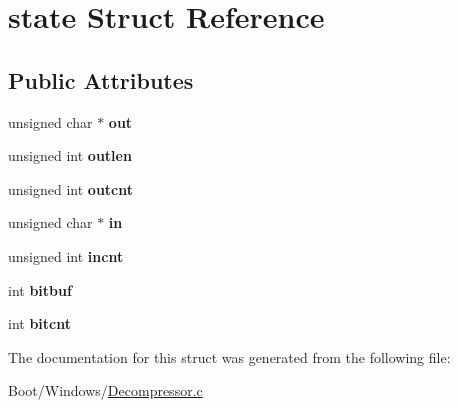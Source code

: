 \hypertarget{structstate}{}\section{state Struct Reference}
\label{structstate}
\subsection*{Public Attributes}
\begin{DoxyCompactItemize}
\item 
\mbox{\label{structstate_a8802c4d6ed3336d4d1f9a1ca86e0b1eb}} 
unsigned char $\ast$ {\bfseries out}
\item 
\mbox{\label{structstate_a3ee881b11de9c743f31ce864342ff33b}} 
unsigned int {\bfseries outlen}
\item 
\mbox{\label{structstate_a24b9c400243f3eda2e148b06826ebb7d}} 
unsigned int {\bfseries outcnt}
\item 
\mbox{\label{structstate_aafccd28823b0f3e3a2ddefa99f2fad61}} 
unsigned char $\ast$ {\bfseries in}
\item 
\mbox{\label{structstate_a46cb495bb708ecf091f4f2afdf0263b4}} 
unsigned int {\bfseries incnt}
\item 
\mbox{\label{structstate_a582d99a570119648c33ef9c5acf00a0f}} 
int {\bfseries bitbuf}
\item 
\mbox{\label{structstate_ad1c5dbfc0c1c555bd5e30f830868e319}} 
int {\bfseries bitcnt}
\end{DoxyCompactItemize}


The documentation for this struct was generated from the following file\+:\begin{DoxyCompactItemize}
\item 
Boot/\+Windows/\hyperlink{_decompressor_8c}{Decompressor.\+c}\end{DoxyCompactItemize}
